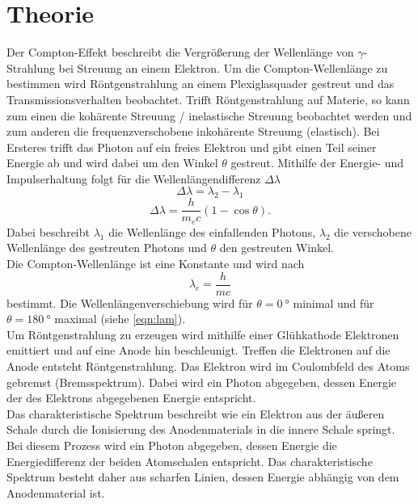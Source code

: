 \section{Theorie}
\label{sec:Theorie}
Der Compton-Effekt beschreibt die Vergrößerung der Wellenlänge von $\gamma$-Strahlung bei Streuung an einem Elektron.
Um die Compton-Wellenlänge zu bestimmen wird Röntgenstrahlung an einem Plexiglasquader gestreut und das Transmissionsverhalten beobachtet.
Trifft Röntgenstrahlung auf Materie, so kann zum einen die kohärente Streuung / inelastische Streuung beobachtet werden und zum anderen die frequenzverschobene inkohärente Streuung (elastisch).
Bei Ersteres trifft das Photon auf ein freies Elektron und gibt einen Teil seiner Energie ab und wird dabei um den Winkel $\theta$ gestreut. 
Mithilfe der Energie- und Impulserhaltung folgt für die Wellenlängendifferenz $\Delta \lambda$
\begin{equation*}
    \Delta \lambda = \lambda_2 - \lambda_1
\end{equation*}
\begin{equation}
    \Delta \lambda = \frac{h}{m_e c} (1 - \cos \theta) .
    \label{eqn:lam}
\end{equation}
Dabei beschreibt $\lambda_1$ die Wellenlänge des einfallenden Photons, $\lambda_2$ die verschobene Wellenlänge des gestreuten Photons und $\theta$ den gestreuten Winkel.
\\
Die Compton-Wellenlänge ist eine Konstante und wird nach
\begin{equation}
    \lambda_c = \frac{h}{m c}
\end{equation}
bestimmt.
Die Wellenlängenverschiebung wird für $\theta = \SI{0}{\degree}$ minimal und für $\theta = \SI{180}{\degree}$ maximal (siehe \autoref{eqn:lam}).
\\
Um Röntgenstrahlung zu erzeugen wird mithilfe einer Glühkathode Elektronen emittiert und auf eine Anode hin beschleunigt.
Treffen die Elektronen auf die Anode entsteht Röntgenstrahlung.
Das Elektron wird im Coulombfeld des Atoms gebremst (Bremsspektrum).
Dabei wird ein Photon abgegeben, dessen Energie der des Elektrons abgegebenen Energie entspricht.
\\
Das charakteristische Spektrum beschreibt wie ein Elektron aus der äußeren Schale durch die Ionisierung des Anodenmaterials in die innere Schale springt.
Bei diesem Prozess wird ein Photon abgegeben, dessen Energie die Energiedifferenz der beiden Atomschalen entspricht.
Das charakteristische Spektrum besteht daher aus scharfen Linien, dessen Energie abhängig von dem Anodenmaterial ist.
